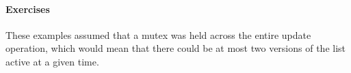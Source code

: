 \paragraph{Exercises}
\label{sec:defer:Exercises}

These examples assumed that a mutex was held across the entire
update operation, which would mean that there could be at most two
versions of the list active at a given time.

